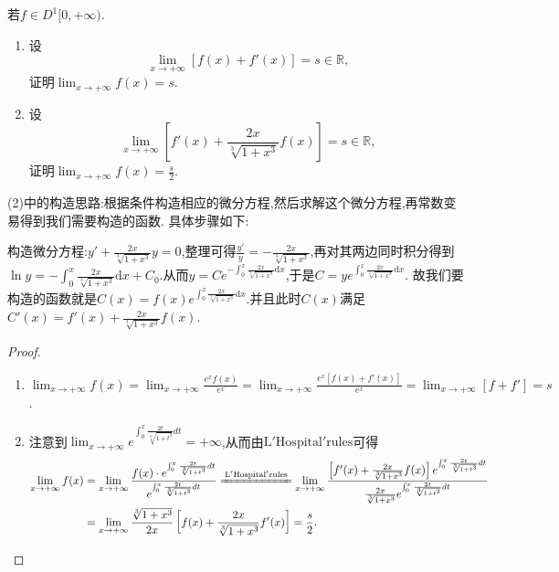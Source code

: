 \documentclass[../../main.tex]{subfiles}
\begin{document}
\begin{example}
若\(f\in D^1[0,+\infty)\).
\begin{enumerate}[(1)]
\item 设
\[
\lim_{x\rightarrow +\infty}[f(x)+f'(x)] = s\in\mathbb{R},
\]
证明\(\lim_{x\rightarrow +\infty}f(x)=s\).

\item 设
\[
\lim_{x\rightarrow +\infty}\left[f'(x)+\frac{2x}{\sqrt[3]{1 + x^{3}}}f(x)\right]=s\in\mathbb{R},
\]
证明\(\lim_{x\rightarrow +\infty}f(x)=\frac{s}{2}\).
\end{enumerate}
\end{example}
\begin{note}
(2)中的构造思路:根据条件构造相应的微分方程,然后求解这个微分方程,再常数变易得到我们需要构造的函数. 具体步骤如下:

构造微分方程:\(y'+\frac{2x}{\sqrt[3]{1 + x^3}}y = 0\),整理可得\(\frac{y'}{y}=-\frac{2x}{\sqrt[3]{1 + x^3}}\),再对其两边同时积分得到\(\ln y = -\int_{0}^{x}\frac{2x}{\sqrt[3]{1 + x^3}}\mathrm{d}x + C_0\).从而\(y = Ce^{-\int_{0}^{x}\frac{2x}{\sqrt[3]{1 + x^3}}\mathrm{d}x}\),于是\(C = ye^{\int_{0}^{x}\frac{2x}{\sqrt[3]{1 + x^3}}\mathrm{d}x}\).
故我们要构造的函数就是\(C(x) = f(x)e^{\int_{0}^{x}\frac{2x}{\sqrt[3]{1 + x^3}}\mathrm{d}x}\).并且此时$C(x)$满足$C'\left( x \right) =f'\left( x \right) +\frac{2x}{\sqrt[3]{1+x^3}}f\left( x \right)$.
\end{note}
\begin{proof}
\begin{enumerate}[(1)]
\item $\lim_{x\rightarrow +\infty}f(x) = \lim_{x\rightarrow +\infty}\frac{e^{x}f(x)}{e^{x}}
=\lim_{x\rightarrow +\infty}\frac{e^{x}[f(x)+f'(x)]}{e^{x}}
=\lim_{x\rightarrow +\infty}[f + f']
=s$.

\item 注意到$\lim_{x\rightarrow +\infty} e^{\int_0^x{\frac{2t}{\sqrt[3]{1+t^3}}dt}}=+\infty$,从而由$\mathrm{L}'\mathrm{Hospital}'\mathrm{rules}$可得
\begin{align*}
\lim_{x\rightarrow +\infty} f(x)&=\lim_{x\rightarrow +\infty} \frac{f(x)\cdot e^{\int_0^x{\frac{2t}{\sqrt[3]{1+t^3}}dt}}}{e^{\int_0^x{\frac{2t}{\sqrt[3]{1+t^3}}dt}}}\xlongequal[]{\mathrm{L}'\mathrm{Hospital}'\mathrm{rules}}\lim_{x\rightarrow +\infty} \frac{\left[ f'(x)+\frac{2x}{\sqrt[3]{1+x^3}}f(x) \right] e^{\int_0^x{\frac{2t}{\sqrt[3]{1+t^3}}dt}}}{\frac{2x}{\sqrt[3]{1+x^3}}e^{\int_0^x{\frac{2t}{\sqrt[3]{1+t^3}}dt}}}
\\
&=\lim_{x\rightarrow +\infty} \frac{\sqrt[3]{1+x^3}}{2x}\left[ f(x)+\frac{2x}{\sqrt[3]{1+x^3}}f'(x) \right] =\frac{s}{2}.
\end{align*}
\end{enumerate}
\end{proof}
\end{document}
